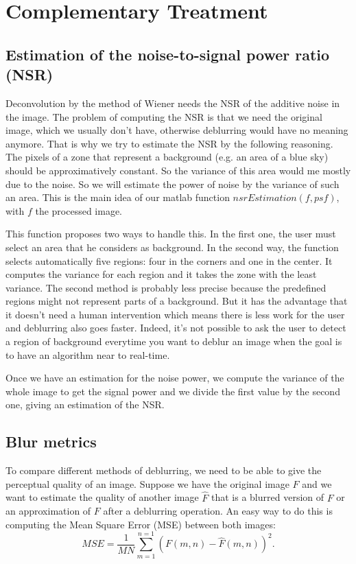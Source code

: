 \section{Complementary Treatment}

\subsection{Estimation of the noise-to-signal power ratio (NSR)}
\label{subsec:NSREstimation}
Deconvolution by the method of Wiener needs the NSR of the additive noise in the image. The problem of computing the NSR is that we need the original image, which we usually don't have, otherwise deblurring would have no meaning anymore. That is why we try to estimate the NSR by the following reasoning. The pixels of a zone that represent a background (e.g. an area of a blue sky) should be approximatively constant. So the variance of this area would me mostly due to the noise. So we will estimate the power of noise by the variance of such an area. This is the main idea of our matlab function $nsrEstimation(f,psf)$, with $f$ the processed image. %

This function proposes two ways to handle this. In the first one, the user must select an area that he considers as background. In the second way, the function selects automatically five regions: four in the corners and one in the center. It computes the variance for each region and it takes the zone with the least variance. The second method is probably less precise because the predefined regions might not represent parts of a background. But it has the advantage that it doesn't need a human intervention which means there is less work for the user and deblurring also goes faster. Indeed, it's not possible to ask the user to detect a region of background everytime you want to deblur an image when the goal is to have an algorithm near to real-time.

Once we have an estimation for the noise power, we compute the variance of the whole image to get the signal power and we divide the first value by the second one, giving an estimation of the NSR.


\subsection{Blur metrics}

To compare different methods of deblurring, we need to be able to give the perceptual quality of an image. Suppose we have the original image $F$ and we want to estimate the quality of another image $\hat{F}$ that is a blurred version of $F$ or an approximation of $F$ after a deblurring operation. An easy way to do this is computing the Mean Square Error (MSE) between both images:
\begin{equation}
MSE=\frac{1}{MN} \sum\limits_{m=1}^{n=1}\left(F(m,n)-\hat{F}(m,n)\right)^2.
\end{equation}

